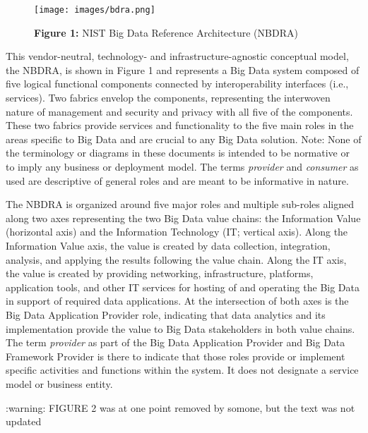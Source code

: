 \documentclass[9pt,]{article}
\newenvironment{Shaded}{}{}
\newcommand{\ExtensionTok}[1]{#1}
\newcommand{\NormalTok}[1]{#1}
\begin{document}
\begin{figure}
\centering
\texttt{[image: images/bdra.png]}
\caption{\textbf{Figure 1:} NIST Big Data Reference Architecture
(NBDRA)}
\end{figure}

This vendor-neutral, technology- and infrastructure-agnostic conceptual
model, the NBDRA, is shown in Figure 1 and represents a Big Data system
composed of five logical functional components connected by
interoperability interfaces (i.e., services). Two fabrics envelop the
components, representing the interwoven nature of management and
security and privacy with all five of the components. These two fabrics
provide services and functionality to the five main roles in the areas
specific to Big Data and are crucial to any Big Data solution. Note:
None of the terminology or diagrams in these documents is intended to be
normative or to imply any business or deployment model. The terms
\emph{provider} and \emph{consumer} as used are descriptive of general
roles and are meant to be informative in nature.

The NBDRA is organized around five major roles and multiple sub-roles
aligned along two axes representing the two Big Data value chains: the
Information Value (horizontal axis) and the Information Technology (IT;
vertical axis). Along the Information Value axis, the value is created
by data collection, integration, analysis, and applying the results
following the value chain. Along the IT axis, the value is created by
providing networking, infrastructure, platforms, application tools, and
other IT services for hosting of and operating the Big Data in support
of required data applications. At the intersection of both axes is the
Big Data Application Provider role, indicating that data analytics and
its implementation provide the value to Big Data stakeholders in both
value chains. The term \emph{provider} as part of the Big Data
Application Provider and Big Data Framework Provider is there to
indicate that those roles provide or implement specific activities and
functions within the system. It does not designate a service model or
business entity.

\begin{Shaded}
\begin{Highlighting}[]
\NormalTok{:}\ExtensionTok{warning}\NormalTok{: FIGURE 2 was at one point removed by somone, but the text was not updated}
\end{Highlighting}
\end{Shaded}
\end{document}
